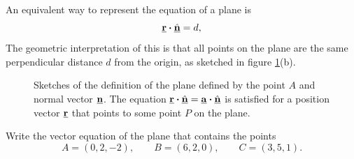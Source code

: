 An equivalent way to represent the equation of a plane is
\[
\underline{\mathbf{r}}\boldsymbol{\cdot}\hat{\underline{\mathbf{n}}}=d,
\]
The geometric interpretation of this is that all points on the plane are the same perpendicular distance $d$ from the origin, as sketched in figure \ref{fig:plane}(b).
\begin{figure}
    \centering
    \caption{Sketches of the definition of the plane defined by the point $A$ and normal vector $\underline{\mathbf{n}}$. The equation $\underline{\mathbf{r}}\boldsymbol{\cdot}\hat{\underline{\mathbf{n}}}
=\underline{\mathbf{a}}\boldsymbol{\cdot}\hat{\underline{\mathbf{n}}}$ is satisfied for a position vector $\underline{\mathbf{r}}$ that points to some point $P$ on the plane. }
    \label{fig:plane}
\end{figure}

\begin{example}[Lecture]
Write the vector equation of the plane that contains the points
\[
A=(0,2,-2),
\qquad
B=(6,2,0),
\qquad
C=(3,5,1).
\]
\end{example}

